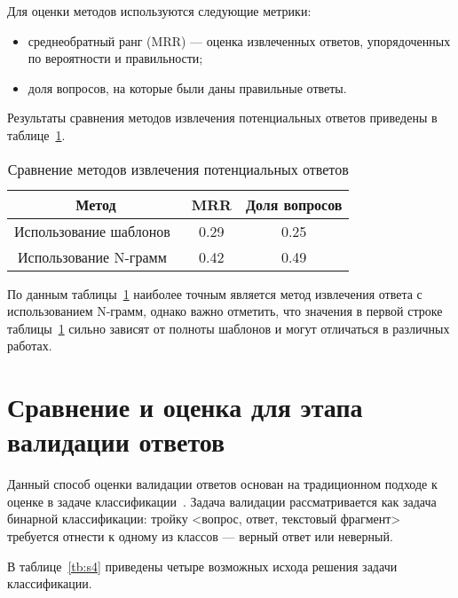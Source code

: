 Для оценки методов используются следующие метрики:

\begin{itemize}[label=---]
	\item среднеобратный ранг (MRR) --- оценка извлеченных ответов, упорядоченных по вероятности и правильности;
	\item доля вопросов, на которые были даны правильные ответы.
\end{itemize}

Результаты сравнения методов извлечения потенциальных ответов приведены в таблице~\ref{tb:s3}.

\begin{table}[h!]
	\begin{center}
		\begin{threeparttable}
			\captionsetup{justification=raggedright,singlelinecheck=off}
			\caption{\label{tb:s3} Сравнение методов извлечения потенциальных ответов}
			\begin{tabular}{|c|c|c|}
				\hline
				Метод & MRR & Доля вопросов \\ [0.8ex] 
				\hline
				Использование шаблонов~\cite{patterns2} & 0.29 & 0.25 \\
				\hline
				Использование N-грамм~\cite{ns2} & 0.42 & 0.49 \\
				\hline
			\end{tabular}
		\end{threeparttable} 
	\end{center}
\end{table}

По данным таблицы~\ref{tb:s3} наиболее точным является метод извлечения ответа с использованием N-грамм, однако важно отметить, что значения в первой строке таблицы~\ref{tb:s3} сильно зависят от полноты шаблонов и могут отличаться в различных работах.

\section{Сравнение и оценка для этапа валидации ответов}

Данный способ оценки валидации ответов основан на традиционном подходе к оценке в задаче классификации~\cite{valid}. Задача валидации рассматривается как задача бинарной классификации: тройку <вопрос, ответ, текстовый фрагмент> требуется отнести к одному из классов --- верный ответ или неверный.

В таблице~\ref{tb:s4} приведены четыре возможных исхода решения задачи классификации.

